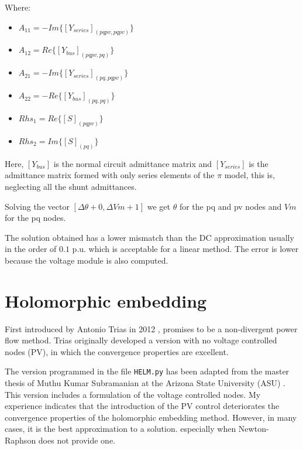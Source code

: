 \documentclass[nols,a4paper,twoside,symmetric,notoc,fleqn]{tufte-book}
\begin{document}
Where:
\begin{itemize}
	\item $A_{11} = -Im \{ [Y_{series}]_{(pqpv, pqpv)} \}$
	\item $A_{12} = Re \{ [Y_{bus}]_{(pqpv, pq)} \}$
	\item $A_{21} = -Im \{ [Y_{series}]_{(pq, pqpv)} \}$
	\item $A_{22} = -Re \{ [Y_{bus}]_{(pq, pq)} \}$
	\item $Rhs_1 = Re \{ [S]_{(pqpv)} \} $
	\item $Rhs_2 = Im \{ [S]_{(pq)} \} $\newline
\end{itemize}

Here, $[Y_{bus}]$ is the normal circuit admittance matrix and $[Y_{series}]$ is the admittance matrix formed with only series elements of the $\pi$ model, this is, neglecting all the shunt admittances.

Solving the vector $[\Delta \theta + 0, \Delta Vm + 1]$ we get $\theta$ for the pq and pv nodes and $Vm$ for the pq nodes.\newline

%

The solution obtained has a lower mismatch than the DC approximation usually in the order of $0.1$ p.u. which is acceptable for a linear method. The error is lower because the voltage module is also computed.

\section{Holomorphic embedding}

First introduced by Antonio Trias in 2012 \cite{TriasHELM}, promises to be a non-divergent power flow method. Trias originally developed a version with no voltage controlled nodes (PV), in which the convergence properties are excellent. 

The version programmed in the file \verb|HELM.py| has been adapted from the master thesis of Muthu Kumar Subramanian at the Arizona State University (ASU) \cite{subramanian2014application}. This version includes a formulation of the voltage controlled nodes. My experience indicates that the introduction of the PV control deteriorates the convergence properties of the holomorphic embedding method. However, in many cases, it is the best approximation to a solution. especially when Newton-Raphson does not provide one.
\end{document}
